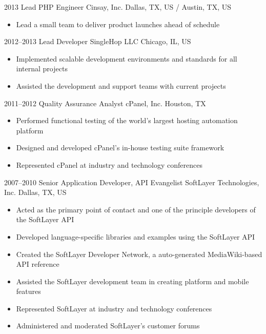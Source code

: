 \documentclass[11pt,a4paper,sans]{moderncv}
\begin{document}
  \cventry
    {2013}
    {Lead PHP Engineer}
    {Cinsay, Inc.}
    {Dallas, TX, US / Austin, TX, US}
    {}
    {
      \begin{itemize}
        \item Lead a small team to deliver product launches ahead of schedule
      \end{itemize}
    }

  \cventry
    {2012--2013}
    {Lead Developer}
    {SingleHop LLC}
    {Chicago, IL, US}
    {}
    {
      \begin{itemize}
        \item Implemented scalable development environments and standards for all internal projects
        \item Assisted the development and support teams with current projects
      \end{itemize}
    }

  \cventry
    {2011--2012}
    {Quality Assurance Analyst}
    {cPanel, Inc.}
    {Houston, TX}
    {}
    {
      \begin{itemize}
        \item Performed functional testing of the world's largest hosting automation platform
        \item Designed and developed cPanel's in-house testing suite framework
        \item Represented cPanel at industry and technology conferences
      \end{itemize}
    }

  \cventry
    {2007--2010}
    {Senior Application Developer, API Evangelist}
    {SoftLayer Technologies, Inc.}
    {Dallas, TX, US}
    {}
    {
      \begin{itemize}
        \item Acted as the primary point of contact and one of the principle developers of the SoftLayer API
        \item Developed language-specific libraries and examples using the SoftLayer API
        \item Created the SoftLayer Developer Network, a auto-generated MediaWiki-based API reference
        \item Assisted the SoftLayer development team in creating platform and mobile features
        \item Represented SoftLayer at industry and technology conferences
        \item Administered and moderated SoftLayer's customer forums
      \end{itemize}
    }
\end{document}

